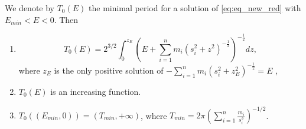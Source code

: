 \documentclass[smallcondensed]{svjour3}
\begin{document}
\begin{theorem}\label{thm:prop.periodos}
We denote by $T_0(E)$ the minimal period for a solution of \eqref{eq:eq_new_red} with $E_{min}<E<0$. Then
\begin{enumerate}
 \item\label{it:T0.formula} 
 \begin{equation}\label{eq:form.T0E-periodo}
 T_0(E)=2^{3/2}\int_{0}^{z_E} \left(E+\sum_{i=1}^n m_i (s_i^2+z^2)^{-\frac12}\right)^{-\frac12} dz,
 \end{equation}
 where $z_E$ is the only positive solution of $-\sum_{i=1}^n m_i (s_i^2+z_{E}^2)^{-\frac12}=E$ ,
 \item\label{it:T0.creciente} $T_0(E)$ is an increasing function.
 \item\label{it:T0.rango} $T_0\left((E_{min},0)\right)=(T_{min},+\infty)$, where  $T_{min}=2\pi\left(\sum_{i=1}^n\frac{m_i}{s_i^3} \right)^{-1/2}$.

 \end{enumerate}
\end{theorem}
\end{document}
